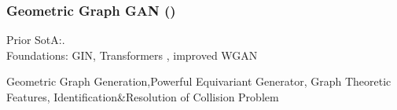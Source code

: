 \documentclass[./presentation.tex]{subfiles}
\begin{document}
\begin{frame}[t]
  \frametitle{Geometric Graph GAN (\cite{krawczukGGGANGeometricGraph2020})}
  \vspace{-1cm}
  \begin{priorart}
   Prior SotA:\cite{yangConditionalStructureGeneration2019e,decaoMolGANImplicitGenerative2022b}.\\
   Foundations: GIN\cite{xuHowPowerfulAre2019e}, Transformers \cite{vaswaniAttentionAllYou2017c}, improved WGAN \cite{gulrajaniImprovedTrainingWasserstein2017d}
  \end{priorart}
  \begin{contributions}
    Geometric Graph Generation,Powerful Equivariant Generator, Graph Theoretic Features, Identification\&Resolution of Collision Problem
  \end{contributions}
  \begin{columns}
  \end{columns}
  
\end{frame}
\end{document}
